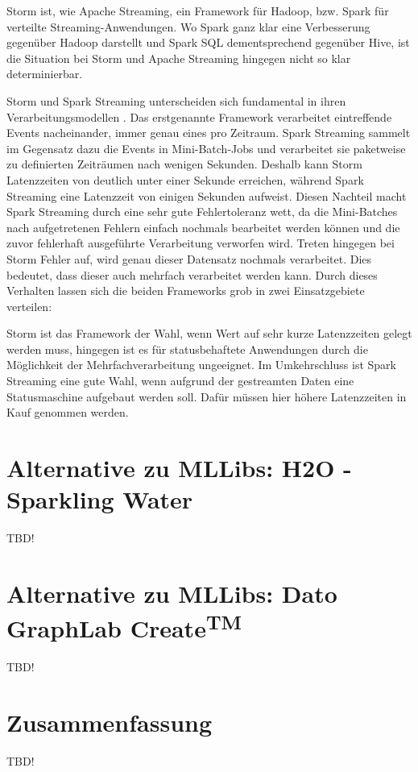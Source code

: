 Storm ist, wie Apache Streaming, ein Framework für Hadoop, bzw. Spark für verteilte Streaming-Anwendungen. Wo Spark ganz klar eine Verbesserung gegenüber Hadoop darstellt und Spark SQL dementsprechend gegenüber Hive, ist die Situation bei Storm und Apache Streaming hingegen nicht so klar determinierbar. 

Storm und Spark Streaming unterscheiden sich fundamental in ihren Verarbeitungsmodellen . Das erstgenannte Framework verarbeitet eintreffende Events nacheinander, immer genau eines pro Zeitraum. Spark Streaming sammelt im Gegensatz dazu die Events in Mini-Batch-Jobs und verarbeitet sie paketweise zu definierten Zeiträumen nach wenigen Sekunden. Deshalb kann Storm Latenzzeiten von deutlich unter einer Sekunde erreichen, während Spark Streaming eine Latenzzeit von einigen Sekunden aufweist. Diesen Nachteil macht Spark Streaming durch eine sehr gute Fehlertoleranz wett, da die Mini-Batches nach aufgetretenen Fehlern einfach nochmals bearbeitet werden können und die zuvor fehlerhaft ausgeführte Verarbeitung verworfen wird. Treten hingegen bei Storm Fehler auf, wird genau dieser Datensatz nochmals verarbeitet. Dies bedeutet, dass dieser auch mehrfach verarbeitet werden kann. Durch dieses Verhalten lassen sich die beiden Frameworks grob in zwei Einsatzgebiete verteilen:

Storm ist das Framework der Wahl, wenn Wert auf sehr kurze Latenzzeiten gelegt werden muss, hingegen ist es für statusbehaftete Anwendungen durch die Möglichkeit der Mehrfachverarbeitung ungeeignet. Im Umkehrschluss ist Spark Streaming eine gute Wahl, wenn aufgrund der gestreamten Daten eine Statusmaschine aufgebaut werden soll. Dafür müssen hier höhere Latenzzeiten in Kauf genommen werden.     

\section{Alternative zu MLLibs: H2O - Sparkling Water}
\label{section:h20}


TBD!


\section{Alternative zu MLLibs: Dato GraphLab Create\textsuperscript{TM}}
\label{section:h20}


TBD!





\section{Zusammenfassung}
\label{section:zusammen}



TBD!


